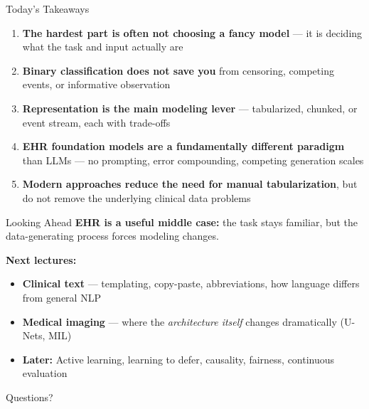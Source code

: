 \documentclass[aspectratio=169,10pt]{beamer}
\begin{document}
\begin{frame}{Today's Takeaways}
\begin{enumerate}[<+->]
    \item \textbf{The hardest part is often not choosing a fancy model} --- it is deciding what the task and input actually are
    \item \textbf{Binary classification does not save you} from censoring, competing events, or informative observation
    \item \textbf{Representation is the main modeling lever} --- tabularized, chunked, or event stream, each with trade-offs
    \item \textbf{EHR foundation models are a fundamentally different paradigm} than LLMs --- no prompting, error compounding, competing generation scales
    \item \textbf{Modern approaches reduce the need for manual tabularization}, but do not remove the underlying clinical data problems
\end{enumerate}
\end{frame}

\begin{frame}{Looking Ahead}
\textbf{EHR is a useful middle case:} the task stays familiar, but the data-generating process forces modeling changes.
\vspace{0.5em}

\textbf{Next lectures:}
\begin{itemize}
    \item \textbf{Clinical text} --- templating, copy-paste, abbreviations, how language differs from general NLP
    \item \textbf{Medical imaging} --- where the \emph{architecture itself} changes dramatically (U-Nets, MIL)
    \item \textbf{Later:} Active learning, learning to defer, causality, fairness, continuous evaluation
\end{itemize}
\end{frame}

\begin{frame}[standout]
    Questions?
\end{frame}

\appendix
\end{document}
